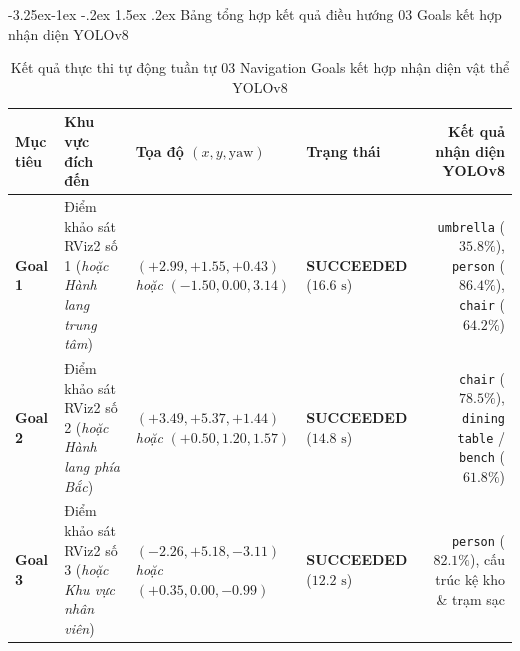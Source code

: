 \documentclass[11pt,a4paper]{article}
\makeatletter
\renewcommand{\subsection}{\@startsection{subsection}{2}{\z@}%
  {-3.25ex\@plus -1ex \@minus -.2ex}%
  {1.5ex \@plus .2ex}%
  {\normalfont\normalsize\bfseries\color{secondary}}}
\makeatother
\begin{document}
\subsection{Bảng tổng hợp kết quả điều hướng 03 Goals kết hợp nhận diện YOLOv8}
\begin{table}[H]
\centering
\footnotesize
\setlength{\tabcolsep}{4pt}
\begin{tabularx}{\textwidth}{L{1.7cm}L{3.3cm}L{3.5cm}L{2.4cm}R}
\toprule
\textbf{\color{primary}Mục tiêu} & \textbf{\color{primary}Khu vực đích đến} & \textbf{\color{primary}Tọa độ $(x, y, \text{yaw})$} & \textbf{\color{primary}Trạng thái} & \textbf{\color{primary}Kết quả nhận diện YOLOv8} \\
\midrule
\textbf{Goal 1} & Điểm khảo sát RViz2 số 1 (\textit{hoặc Hành lang trung tâm}) & $(+2.99, +1.55, +0.43)$ \newline \textit{hoặc} $(-1.50, 0.00, 3.14)$ & \textbf{\color{commentgreen}SUCCEEDED} \newline ($16.6\text{ s}$) & \texttt{umbrella} ($35.8\%$), \texttt{person} ($86.4\%$), \texttt{chair} ($64.2\%$) \\
\textbf{Goal 2} & Điểm khảo sát RViz2 số 2 (\textit{hoặc Hành lang phía Bắc}) & $(+3.49, +5.37, +1.44)$ \newline \textit{hoặc} $(+0.50, 1.20, 1.57)$ & \textbf{\color{commentgreen}SUCCEEDED} \newline ($14.8\text{ s}$) & \texttt{chair} ($78.5\%$), \texttt{dining table} / \texttt{bench} ($61.8\%$) \\
\textbf{Goal 3} & Điểm khảo sát RViz2 số 3 (\textit{hoặc Khu vực nhân viên}) & $(-2.26, +5.18, -3.11)$ \newline \textit{hoặc} $(+0.35, 0.00, -0.99)$ & \textbf{\color{commentgreen}SUCCEEDED} \newline ($12.2\text{ s}$) & \texttt{person} ($82.1\%$), cấu trúc kệ kho \& trạm sạc \\
\bottomrule
\end{tabularx}
\caption{Kết quả thực thi tự động tuần tự 03 Navigation Goals kết hợp nhận diện vật thể YOLOv8}
\label{tab:final_results}
\end{table}
\end{document}

